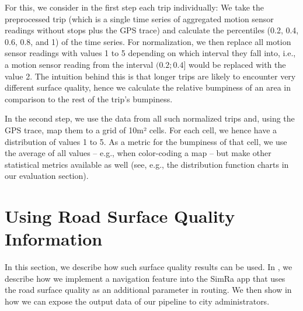For this, we consider in the first step each trip individually:
We take the preprocessed trip (which is a single time series of aggregated motion sensor readings without stops plus the GPS trace) and calculate the percentiles (0.2, 0.4, 0.6, 0.8, and 1) of the time series.
For normalization, we then replace all motion sensor readings with values 1 to 5 depending on which interval they fall into, i.e., a motion sensor reading from the interval $(0.2;0.4]$ would be replaced with the value 2.
The intuition behind this is that longer trips are likely to encounter very different surface quality, hence we calculate the relative bumpiness of an area in comparison to the rest of the trip's bumpiness.

In the second step, we use the data from all such normalized trips and, using the GPS trace, map them to a grid of 10m² cells.
For each cell, we hence have a distribution of values 1 to 5.
As a metric for the bumpiness of that cell, we use the average of all values -- e.g., when color-coding a map -- but make other statistical metrics available as well (see, e.g., the distribution function charts in our evaluation section).

\section{Using Road Surface Quality Information}
\label{sec:using_road_surface_quality_information}
In this section, we describe how such surface quality results can be used.
In , we describe how we implement a navigation feature into the SimRa app that uses the road surface quality as an additional parameter in routing.
We then show in  how we can expose the output data of our pipeline to city administrators.


